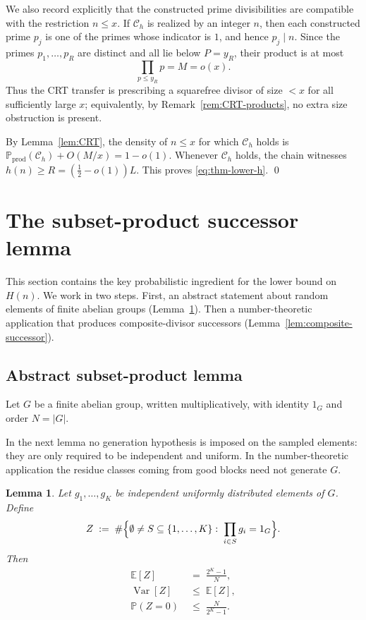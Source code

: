 \documentclass[11pt,reqno]{amsart}
\theoremstyle{plain}
\newtheorem{lemma}[theorem]{Lemma}
\theoremstyle{definition}
\newcommand{\PP}{\mathbb{P}}
\newcommand{\EE}{\mathbb{E}}
\newcommand{\Var}{\operatorname{Var}}
\begin{document}
We also record explicitly that the constructed prime divisibilities are
compatible with the restriction $n\le x$. If $\mathcal C_h$ is realized by an
integer $n$, then each constructed prime $p_j$ is one of the primes whose
indicator is $1$, and hence $p_j\mid n$. Since the primes $p_1,\dots,p_R$ are
distinct and all lie below $P=y_R$, their product is at most
\[
\prod_{p\le y_R}p=M=o(x).
\]
Thus the CRT transfer is prescribing a squarefree divisor of size $<x$ for all
sufficiently large $x$; equivalently, by Remark~\ref{rem:CRT-products}, no
extra size obstruction is present.

By Lemma~\ref{lem:CRT}, the density of $n\le x$ for which $\mathcal{C}_h$ holds
is $\PP_{\mathrm{prod}}(\mathcal{C}_h)+O(M/x)=1-o(1)$. Whenever $\mathcal{C}_h$
holds, the chain witnesses $h(n)\ge R=(\tfrac12-o(1))L$. This proves
\eqref{eq:thm-lower-h}. \qed

\section{The subset-product successor lemma}\label{sec:subset-product}

This section contains the key probabilistic ingredient for the lower bound on $H(n)$. We work in two steps. First, an abstract statement about random elements of finite abelian groups (Lemma~\ref{lem:subset-product}). Then a number-theoretic application that produces composite-divisor successors (Lemma~\ref{lem:composite-successor}).

\subsection{Abstract subset-product lemma}

Let $G$ be a finite abelian group, written multiplicatively, with identity
$1_G$ and order $N=|G|$.

In the next lemma no generation hypothesis is imposed on the sampled elements:
they are only required to be independent and uniform. In the number-theoretic
application the residue classes coming from good blocks need not generate $G$.

\begin{lemma}\label{lem:subset-product}
Let $g_1,\dots,g_K$ be independent uniformly distributed elements of $G$. Define
\begin{equation}\label{eq:Z-def}
Z \;:=\; \#\Bigl\{\emptyset\ne S\subseteq\{1,\dots,K\}:\;\prod_{i\in S} g_i = 1_G\Bigr\}.
\end{equation}
Then
\begin{align}
\EE[Z] &\;=\; \frac{2^K-1}{N}, \label{eq:EZ}\\
\Var[Z] &\;\le\; \EE[Z], \label{eq:VarZ}\\
\PP(Z=0) &\;\le\; \frac{N}{2^K-1}.\label{eq:PZzero}
\end{align}
\end{lemma}
\end{document}
